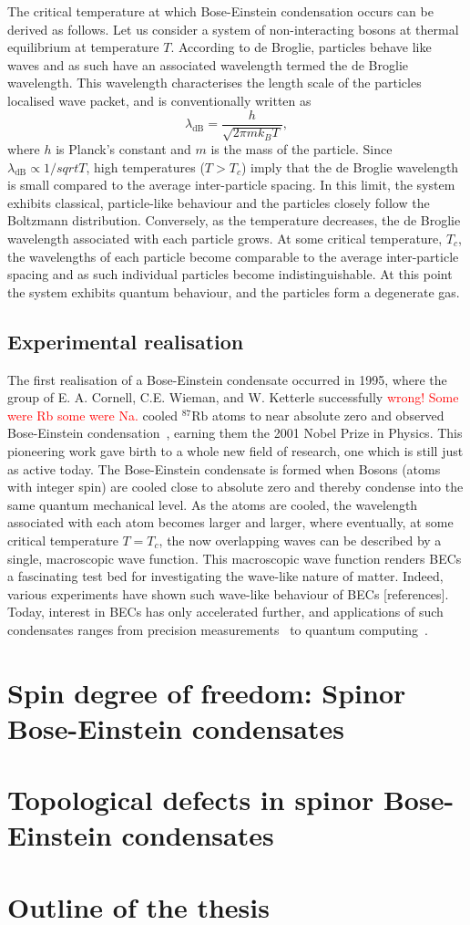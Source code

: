 The critical temperature at which Bose-Einstein condensation occurs can be
derived as follows.
Let us consider a system of non-interacting bosons at thermal equilibrium at
temperature \(T\).
According to de Broglie, particles behave like waves and as such have an
associated wavelength termed the de Broglie wavelength.
This wavelength characterises the length scale of the particles localised
wave packet, and is conventionally written as
\begin{equation}
    \lambda_\text{dB} = \frac{h}{\sqrt{2\pi mk_B T}},
\end{equation}
where \(h\) is Planck's constant and \(m\) is the mass of the particle.
Since \(\lambda_\text{dB} \propto 1 / sqrt{T}\), high temperatures (\(T > T_c\))
imply that the de Broglie wavelength is small compared to the average
inter-particle spacing.
In this limit, the system exhibits classical, particle-like behaviour and the
particles closely follow the Boltzmann distribution.
Conversely, as the temperature decreases, the de Broglie wavelength associated
with each particle grows.
At some critical temperature, \(T_c\), the wavelengths of each particle become
comparable to the average inter-particle spacing and as such individual
particles become indistinguishable.
At this point the system exhibits quantum behaviour, and the particles form a
degenerate gas.

\subsection{Experimental realisation}
The first realisation of a Bose-Einstein condensate occurred in 1995, where the
group of E. A. Cornell, C.E. Wieman, and W. Ketterle successfully
\textcolor{red}{wrong! Some were Rb some were Na.} cooled
\( ^{87}\text{Rb}\) atoms to near absolute zero and observed Bose-Einstein
condensation~\cite{Anderson1995}, earning them the 2001 Nobel Prize in Physics.
This pioneering work gave birth to a whole new field of research, one which is
still just as active today.
The Bose-Einstein condensate is formed when Bosons (atoms with integer spin)
are cooled close to absolute zero and thereby condense into the same quantum
mechanical level.
As the atoms are cooled, the wavelength associated with each atom becomes larger
and larger, where eventually, at some critical temperature \(T = T_c\), the
now overlapping waves can be described by a single, macroscopic wave function.
This macroscopic wave function renders BECs a fascinating test bed for
investigating the wave-like nature of matter.
Indeed, various experiments have shown such wave-like behaviour of BECs
    [references].
Today, interest in BECs has only accelerated further, and applications of such
condensates ranges from precision measurements~\cite{Obrecht2007} to
quantum computing~\cite{Byrnes2012}.

\section{Spin degree of freedom: Spinor Bose-Einstein condensates}

\section{Topological defects in spinor Bose-Einstein condensates}

\section{Outline of the thesis}
